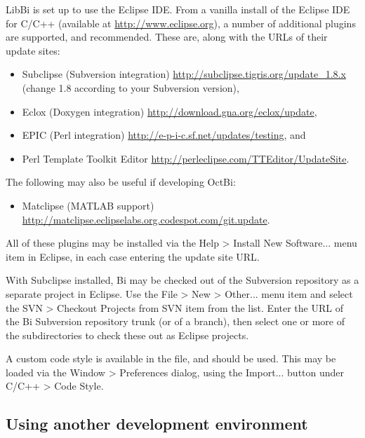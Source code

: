 LibBi is set up to use the Eclipse IDE. From a vanilla install of the Eclipse
IDE for C/C++ (available at
\href{http://www.eclipse.org}{http://www.eclipse.org}), a number of additional
plugins are supported, and recommended. These are, along with the URLs of their
update sites:
\begin{itemize}
\item Subclipse (Subversion integration) \href{http://subclipse.tigris.org/update}{http://subclipse.tigris.org/update\_1.8.x} (change 1.8 according to your Subversion version),
\item Eclox (Doxygen integration) \href{http://download.gna.org/eclox/update}{http://download.gna.org/eclox/update},
\item EPIC (Perl integration) \href{http://e-p-i-c.sf.net/updates/testing}{http://e-p-i-c.sf.net/updates/testing}, and
\item Perl Template Toolkit Editor \href{http://perleclipse.com/TTEditor/UpdateSite}{http://perleclipse.com/TTEditor/UpdateSite}.
\end{itemize}
The following may also be useful if developing OctBi:
\begin{itemize}
  \item Matclipse (MATLAB support) \href{http://matclipse.eclipselabs.org.codespot.com/git.update}{http://matclipse.eclipselabs.org.codespot.com/git.update}.
\end{itemize}
All of these plugins may be installed via the \textsf{Help > Install New Software...}
menu item in Eclipse, in each case entering the update site URL.

With Subclipse installed, Bi may be checked out of the Subversion repository
as a separate project in Eclipse. Use the \textsf{File > New > Other...} menu
item and select the \textsf{SVN > Checkout Projects from SVN} item from the
list. Enter the URL of the Bi Subversion repository trunk (or of a branch),
then select one or more of the subdirectories to check these out as Eclipse
projects.

 A custom code style is available in the
 file, and should be used. This may be loaded
via the \textsf{Window > Preferences} dialog, using the \textsf{Import...}
button under \textsf{C/C++ > Code Style}.

\subsection{Using another development environment}

